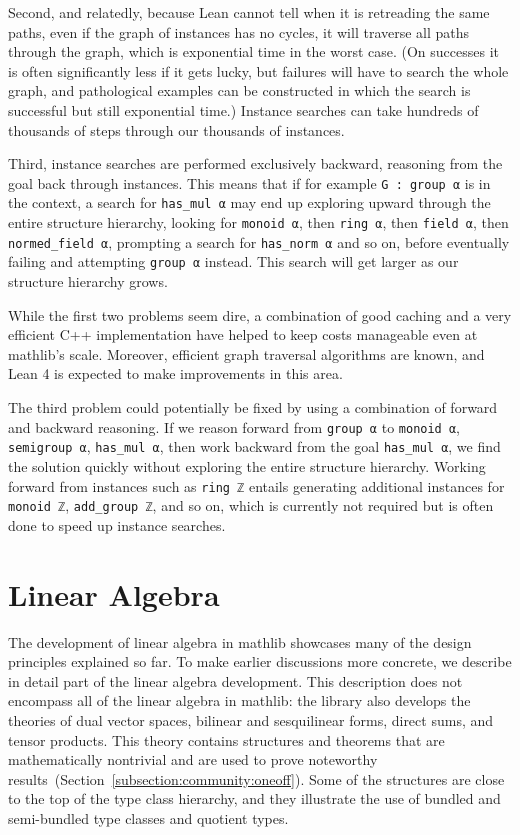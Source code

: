 \documentclass[sigplan]{acmart}\settopmatter{}
\newcommand{\mathlib}{\textsf{mathlib}\xspace}
\begin{document}
Second, and relatedly, because Lean cannot tell when it is retreading the same paths, even if the graph of instances has no cycles, it will traverse all paths through the graph, which is exponential time in the worst case.
(On successes it is often significantly less if it gets lucky, but failures will have to search the whole graph, and pathological examples can be constructed in which the search is successful but still exponential time.) Instance searches can take hundreds of thousands of steps through our thousands of instances.

Third, instance searches are performed exclusively backward, reasoning from the goal back through instances.
This means that if for example \lstinline{G : group α} is in the context,
a search for \lstinline{has_mul α} may end up exploring upward through the entire structure hierarchy, looking for \lstinline{monoid α}, then \lstinline{ring α}, then \lstinline{field α}, then \lstinline{normed_field α}, prompting a search for \lstinline{has_norm α} and so on, before eventually failing and attempting \lstinline{group α} instead.
This search will get larger as our structure hierarchy grows.

While the first two problems seem dire, a combination of good caching and a very efficient C++ implementation have helped to keep costs manageable even at \mathlib's scale.
Moreover, efficient graph traversal algorithms are known, and Lean 4 is expected to make improvements in this area.

The third problem could potentially be fixed by using a combination of forward and backward reasoning.
If we reason forward from \lstinline{group α} to \lstinline{monoid α}, \lstinline{semigroup α}, \lstinline{has_mul α}, then work backward from the goal \lstinline{has_mul α}, we find the solution quickly without exploring the entire structure hierarchy.
Working forward from instances such as \lstinline{ring ℤ} entails generating additional instances for \lstinline{monoid ℤ}, \lstinline{add_group ℤ}, and so on, which is currently not required but is often done to speed up instance searches.

\section{Linear Algebra}
\label{section:linalg}

The development of linear algebra in \mathlib showcases many of the design principles explained so far.
To make earlier discussions more concrete,
we describe in detail part of the linear algebra development.
This description does not encompass all of the linear algebra in \mathlib:
the library also develops the theories of dual vector spaces, bilinear and sesquilinear forms, direct sums, and tensor products.
This theory contains structures and theorems that are mathematically nontrivial
and are used to prove noteworthy results~(Section~\ref{subsection:community:oneoff}).
Some of the structures are close to the top of the type class hierarchy,
and they illustrate the use of bundled and semi-bundled type classes and quotient types.
\end{document}
